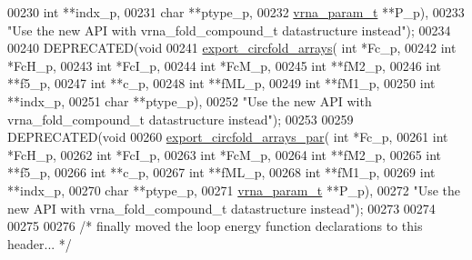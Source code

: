 \begin{DoxyCode}
00230                         \textcolor{keywordtype}{int} **indx\_p,
00231                         \textcolor{keywordtype}{char} **ptype\_p,
00232                         \hyperlink{group__energy__parameters_structvrna__param__s}{vrna\_param\_t} **P\_p),
00233 \textcolor{stringliteral}{"Use the new API with vrna\_fold\_compound\_t datastructure instead"});
00234 
00240 DEPRECATED(\textcolor{keywordtype}{void}
00241 \hyperlink{group__mfe__fold__single_ga04d5d639fd4473ca766436a9bae5665c}{export\_circfold\_arrays}( \textcolor{keywordtype}{int} *Fc\_p,
00242                         \textcolor{keywordtype}{int} *FcH\_p,
00243                         \textcolor{keywordtype}{int} *FcI\_p,
00244                         \textcolor{keywordtype}{int} *FcM\_p,
00245                         \textcolor{keywordtype}{int} **fM2\_p,
00246                         \textcolor{keywordtype}{int} **f5\_p,
00247                         \textcolor{keywordtype}{int} **c\_p,
00248                         \textcolor{keywordtype}{int} **fML\_p,
00249                         \textcolor{keywordtype}{int} **fM1\_p,
00250                         \textcolor{keywordtype}{int} **indx\_p,
00251                         \textcolor{keywordtype}{char} **ptype\_p),
00252 \textcolor{stringliteral}{"Use the new API with vrna\_fold\_compound\_t datastructure instead"});
00253 
00259 DEPRECATED(\textcolor{keywordtype}{void}
00260 \hyperlink{group__mfe__fold__single_ga004bb901e7fd2f8d5ae68f9530318ce1}{export\_circfold\_arrays\_par}( \textcolor{keywordtype}{int} *Fc\_p,
00261                             \textcolor{keywordtype}{int} *FcH\_p,
00262                             \textcolor{keywordtype}{int} *FcI\_p,
00263                             \textcolor{keywordtype}{int} *FcM\_p,
00264                             \textcolor{keywordtype}{int} **fM2\_p,
00265                             \textcolor{keywordtype}{int} **f5\_p,
00266                             \textcolor{keywordtype}{int} **c\_p,
00267                             \textcolor{keywordtype}{int} **fML\_p,
00268                             \textcolor{keywordtype}{int} **fM1\_p,
00269                             \textcolor{keywordtype}{int} **indx\_p,
00270                             \textcolor{keywordtype}{char} **ptype\_p,
00271                             \hyperlink{group__energy__parameters_structvrna__param__s}{vrna\_param\_t} **P\_p),
00272 \textcolor{stringliteral}{"Use the new API with vrna\_fold\_compound\_t datastructure instead"});
00273 
00274 
00275 
00276 \textcolor{comment}{/* finally moved the loop energy function declarations to this header...  */}

\end{DoxyCode}
